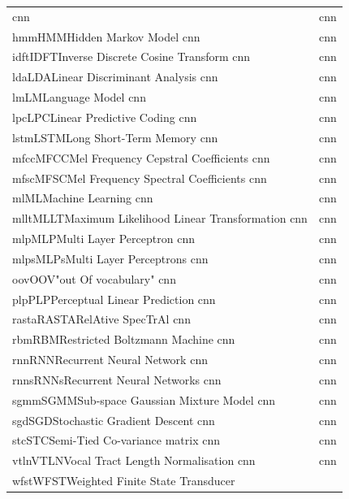 \documentclass[12pt,twoside]{report}
\begin{document}
\begin{table}
\begin{tabular}{ll}
\acrshort{cnn} & \acrlong{cnn} \\{hmm}{HMM}{Hidden Markov Model}
\acrshort{cnn} & \acrlong{cnn} \\{idft}{IDFT}{Inverse Discrete Cosine Transform}
\acrshort{cnn} & \acrlong{cnn} \\{lda}{LDA}{Linear Discriminant Analysis}
\acrshort{cnn} & \acrlong{cnn} \\{lm}{LM}{Language Model}
\acrshort{cnn} & \acrlong{cnn} \\{lpc}{LPC}{Linear Predictive Coding}
\acrshort{cnn} & \acrlong{cnn} \\{lstm}{LSTM}{Long Short-Term Memory}
\acrshort{cnn} & \acrlong{cnn} \\{mfcc}{MFCC}{Mel Frequency Cepstral Coefficients}
\acrshort{cnn} & \acrlong{cnn} \\{mfsc}{MFSC}{Mel Frequency Spectral Coefficients}
\acrshort{cnn} & \acrlong{cnn} \\{ml}{ML}{Machine Learning}
\acrshort{cnn} & \acrlong{cnn} \\{mllt}{MLLT}{Maximum Likelihood Linear Transformation}
\acrshort{cnn} & \acrlong{cnn} \\{mlp}{MLP}{Multi Layer Perceptron}
\acrshort{cnn} & \acrlong{cnn} \\{mlps}{MLPs}{Multi Layer Perceptrons}
\acrshort{cnn} & \acrlong{cnn} \\{oov}{OOV}{"out Of vocabulary"}
\acrshort{cnn} & \acrlong{cnn} \\{plp}{PLP}{Perceptual Linear Prediction}
\acrshort{cnn} & \acrlong{cnn} \\{rasta}{RASTA}{RelAtive SpecTrAl}
\acrshort{cnn} & \acrlong{cnn} \\{rbm}{RBM}{Restricted Boltzmann Machine}
\acrshort{cnn} & \acrlong{cnn} \\{rnn}{RNN}{Recurrent Neural Network}
\acrshort{cnn} & \acrlong{cnn} \\{rnns}{RNNs}{Recurrent Neural Networks}
\acrshort{cnn} & \acrlong{cnn} \\{sgmm}{SGMM}{Sub-space Gaussian Mixture Model}
\acrshort{cnn} & \acrlong{cnn} \\{sgd}{SGD}{Stochastic Gradient Descent}
\acrshort{cnn} & \acrlong{cnn} \\{stc}{STC}{Semi-Tied Co-variance matrix}
\acrshort{cnn} & \acrlong{cnn} \\{vtln}{VTLN}{Vocal Tract Length Normalisation}
\acrshort{cnn} & \acrlong{cnn} \\{wfst}{WFST}{Weighted  Finite State Transducer}
\end{tabular}
\end{table}
\end{document}
